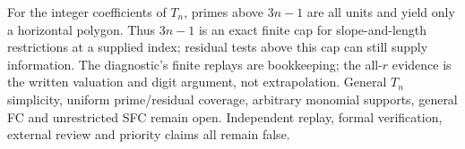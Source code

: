 \documentclass[11pt]{article}
\begin{document}
For the integer coefficients of $T_n$, primes above $3n-1$ are all
units and yield only a horizontal polygon. Thus $3n-1$ is an exact
finite cap for slope-and-length restrictions at a supplied index;
residual tests above this cap can still supply information.
The diagnostic's finite replays are bookkeeping; the all-$r$ evidence
is the written valuation and digit argument, not extrapolation.
General $T_n$ simplicity, uniform prime/residual coverage, arbitrary
monomial supports, general FC and unrestricted SFC remain open.
Independent replay, formal verification, external review and priority
claims all remain false.
\end{document}
